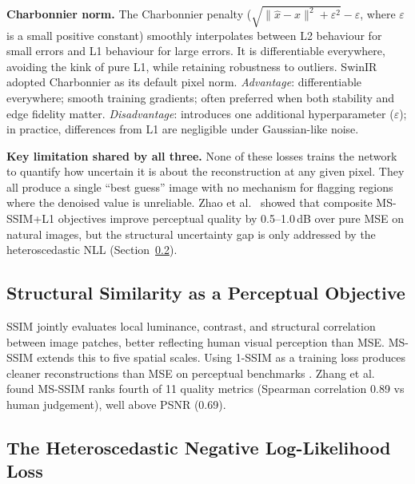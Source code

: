 \documentclass[12pt, a4paper, twoside, openright]{book}
\begin{document}
\textbf{Charbonnier norm.} The Charbonnier penalty \cite{charbonnier_two_1994} ($\sqrt{\|\hat{x}-x\|^2+\varepsilon^2} - \varepsilon$, where $\varepsilon$ is a small positive constant) smoothly interpolates between L2 behaviour for small errors and L1 behaviour for large errors. It is differentiable everywhere, avoiding the kink of pure L1, while retaining robustness to outliers. SwinIR \cite{liang_swinir_2021} adopted Charbonnier as its default pixel norm. \emph{Advantage}: differentiable everywhere; smooth training gradients; often preferred when both stability and edge fidelity matter. \emph{Disadvantage}: introduces one additional hyperparameter ($\varepsilon$); in practice, differences from L1 are negligible under Gaussian-like noise.

\textbf{Key limitation shared by all three.} None of these losses trains the network to quantify how uncertain it is about the reconstruction at any given pixel. They all produce a single ``best guess'' image with no mechanism for flagging regions where the denoised value is unreliable. Zhao et al.\ \cite{zhao_loss_2017} showed that composite MS-SSIM+L1 objectives improve perceptual quality by 0.5--1.0\,dB over pure MSE on natural images, but the structural uncertainty gap is only addressed by the heteroscedastic NLL (Section~\ref{sec:lit:losses:nll}).

\subsection{Structural Similarity as a Perceptual Objective}
\label{sec:lit:losses:ssim}

SSIM \cite{wang_image_2004} jointly evaluates local luminance, contrast, and structural correlation between image patches, better reflecting human visual perception than MSE. MS-SSIM \cite{wang_multiscale_2003} extends this to five spatial scales. Using 1-SSIM as a training loss produces cleaner reconstructions than MSE on perceptual benchmarks \cite{zhao_loss_2017}. Zhang et al.\ \cite{zhang_comprehensive_2012} found MS-SSIM ranks fourth of 11 quality metrics (Spearman correlation 0.89 vs human judgement), well above PSNR (0.69).

\subsection{The Heteroscedastic Negative Log-Likelihood Loss}
\label{sec:lit:losses:nll}
\end{document}
